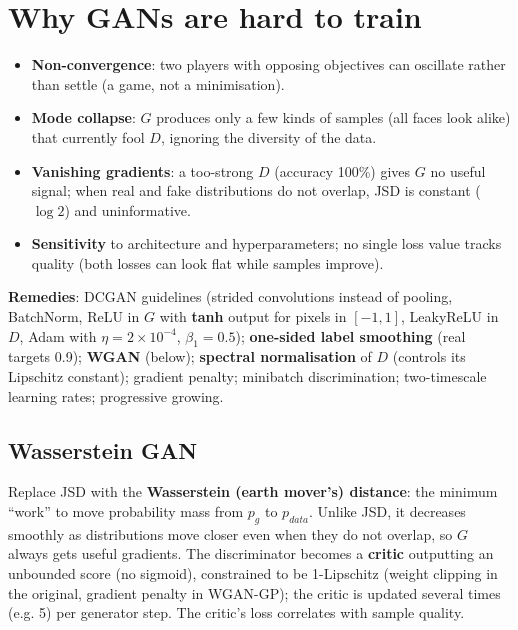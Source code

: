 \section{Why GANs are hard to train}
\begin{itemize}
\item \textbf{Non-convergence}: two players with opposing objectives can oscillate rather than settle (a game, not a minimisation).
\item \textbf{Mode collapse}: $G$ produces only a few kinds of samples (all faces look alike) that currently fool $D$, ignoring the diversity of the data.
\item \textbf{Vanishing gradients}: a too-strong $D$ (accuracy 100\%) gives $G$ no useful signal; when real and fake distributions do not overlap, JSD is constant
  ($\log2$) and uninformative.
\item \textbf{Sensitivity} to architecture and hyperparameters; no single loss value tracks quality (both losses can look flat while samples improve).
\end{itemize}
\textbf{Remedies}: DCGAN guidelines (strided convolutions instead of pooling, BatchNorm, ReLU in $G$ with \textbf{tanh} output for pixels in $[-1, 1]$, LeakyReLU in $D$,
Adam with $\eta = 2\times10^{-4}$, $\beta_1 = 0.5$); \textbf{one-sided label smoothing} (real targets 0.9); \textbf{WGAN} (below); \textbf{spectral normalisation} of $D$
(controls its Lipschitz constant); gradient penalty; minibatch discrimination; two-timescale learning rates; progressive growing.

\subsection{Wasserstein GAN}
Replace JSD with the \textbf{Wasserstein (earth mover's) distance}: the minimum ``work'' to move probability mass from $p_g$ to $p_{data}$. Unlike JSD, it decreases smoothly
as distributions move closer even when they do not overlap, so $G$ always gets useful gradients. The discriminator becomes a \textbf{critic} outputting an unbounded score
(no sigmoid), constrained to be 1-Lipschitz (weight clipping in the original, gradient penalty in WGAN-GP); the critic is updated several times (e.g. 5) per generator
step. The critic's loss correlates with sample quality.

